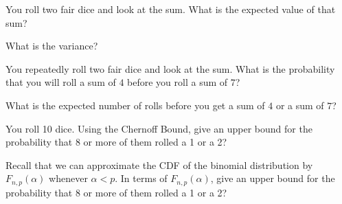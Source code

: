 \documentclass[12pt,oneside]{article}
\begin{document}
\begin{problem}{25}
\bparts
You roll two fair dice and look at the sum. What is the expected value of that sum? 
\vspace{4 in}

What is the variance?
\vspace{4 in}


You repeatedly roll two fair dice and look at the sum. What is the probability that you will roll a sum of $4$ before you roll a sum of $7$?
\vspace{4 in}

What is the expected number of rolls before you get a sum of $4$ or a sum of $7$?

%

\vspace{4 in}

You roll 10 dice.  Using the Chernoff Bound, give an upper bound for the probability that 8 or more of them rolled a 1 or a 2?  

\vspace{4 in}

Recall that we can approximate the CDF of the binomial distribution by $F_{n,p}(\alpha)$
whenever $\alpha < p$.  In terms of $F_{n, p}(\alpha)$, give an upper bound for
the probability that 8 or more of them rolled a 1 or a 2?


\eparts
\end{problem}

\newpage
\end{document}
